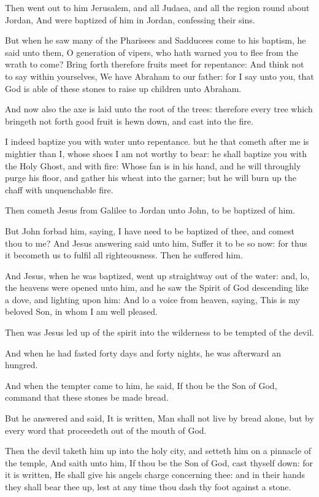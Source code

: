 \Verse Then went out to him Jerusalem, and all Judaea, and all the region round about Jordan, \Verse And were baptized of him in Jordan, confessing their sins.

\Verse But when he saw many of the Pharisees and Sadducees come to his baptism, he said unto them, O generation of vipers, who hath warned you to flee from the wrath to come?  \Verse Bring forth therefore fruits meet for repentance: \Verse And think not to say within yourselves, We have Abraham to our father: for I say unto you, that God is able of these stones to raise up children unto Abraham.

\Verse And now also the axe is laid unto the root of the trees: therefore every tree which bringeth not forth good fruit is hewn down, and cast into the fire.

\Verse I indeed baptize you with water unto repentance. but he that cometh after me is mightier than I, whose shoes I am not worthy to bear: he shall baptize you with the Holy Ghost, and with fire: \Verse Whose fan is in his hand, and he will throughly purge his floor, and gather his wheat into the garner; but he will burn up the chaff with unquenchable fire.

\Verse Then cometh Jesus from Galilee to Jordan unto John, to be baptized of him.

\Verse But John forbad him, saying, I have need to be baptized of thee, and comest thou to me?  \Verse And Jesus answering said unto him, Suffer it to be so now: for thus it becometh us to fulfil all righteousness.  Then he suffered him.

\Verse And Jesus, when he was baptized, went up straightway out of the water: and, lo, the heavens were opened unto him, and he saw the Spirit of God descending like a dove, and lighting upon him: \Verse And lo a voice from heaven, saying, This is my beloved Son, in whom I am well pleased.


\Chapter
\Verse Then was Jesus led up of the spirit into the wilderness to be tempted of the devil.

\Verse And when he had fasted forty days and forty nights, he was afterward an hungred.

\Verse And when the tempter came to him, he said, If thou be the Son of God, command that these stones be made bread.

\Verse But he answered and said, It is written, Man shall not live by bread alone, but by every word that proceedeth out of the mouth of God.

\Verse Then the devil taketh him up into the holy city, and setteth him on a pinnacle of the temple, \Verse And saith unto him, If thou be the Son of God, cast thyself down: for it is written, He shall give his angels charge concerning thee: and in their hands they shall bear thee up, lest at any time thou dash thy foot against a stone.

